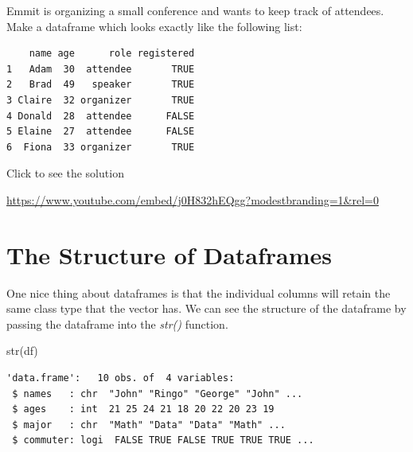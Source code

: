 \documentclass[
  letterpaper,
  DIV=11,
  numbers=noendperiod]{scrreprt}
\newenvironment{Shaded}{\begin{snugshade}}{\end{snugshade}}
\newcommand{\FunctionTok}[1]{\textcolor[rgb]{0.28,0.35,0.67}{#1}}
\newcommand{\NormalTok}[1]{\textcolor[rgb]{0.00,0.23,0.31}{#1}}
\begin{document}
\begin{tcolorbox}[enhanced jigsaw, leftrule=.75mm, arc=.35mm, coltitle=black, rightrule=.15mm, bottomrule=.15mm, toprule=.15mm, left=2mm, colbacktitle=quarto-callout-tip-color!10!white, title=\textcolor{quarto-callout-tip-color}{\faLightbulb}\hspace{0.5em}{Try it Out}, toptitle=1mm, breakable, colframe=quarto-callout-tip-color-frame, bottomtitle=1mm, titlerule=0mm, colback=white, opacityback=0, opacitybacktitle=0.6]

Emmit is organizing a small conference and wants to keep track of
attendees. Make a dataframe which looks exactly like the following list:

\begin{verbatim}
    name age      role registered
1   Adam  30  attendee       TRUE
2   Brad  49   speaker       TRUE
3 Claire  32 organizer       TRUE
4 Donald  28  attendee      FALSE
5 Elaine  27  attendee      FALSE
6  Fiona  33 organizer       TRUE
\end{verbatim}

Click to see the solution

\url{https://www.youtube.com/embed/j0H832hEQgg?modestbranding=1&rel=0}

\end{tcolorbox}

\section{The Structure of Dataframes}\label{the-structure-of-dataframes}

One nice thing about dataframes is that the individual columns will
retain the same class type that the vector has. We can see the structure
of the dataframe by passing the dataframe into the \emph{str()}
function.

\begin{Shaded}
\begin{Highlighting}[]
\FunctionTok{str}\NormalTok{(df)}
\end{Highlighting}
\end{Shaded}

\begin{verbatim}
'data.frame':   10 obs. of  4 variables:
 $ names   : chr  "John" "Ringo" "George" "John" ...
 $ ages    : int  21 25 24 21 18 20 22 20 23 19
 $ major   : chr  "Math" "Data" "Data" "Math" ...
 $ commuter: logi  FALSE TRUE FALSE TRUE TRUE TRUE ...
\end{verbatim}
\end{document}
